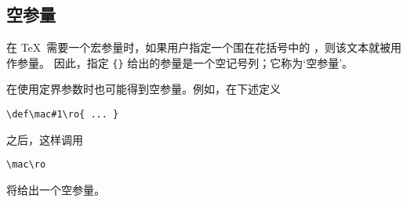 \documentclass[letterpaper]{book}
\begin{document}
\subsection{空参量}

在 \TeX\ 需要一个宏参量时，如果用户指定一个围在花括号中的
，则该文本就被用作参量。
因此，指定 \verb-{}- 给出的参量是一个空记号列；它称为`空参量'。

在使用定界参数时也可能得到空参量。例如，在下述定义
\begin{verbatim}
\def\mac#1\ro{ ... }
\end{verbatim}
之后，这样调用
\begin{verbatim}
\mac\ro
\end{verbatim}
将给出一个空参量。

\begin{comment}
However, only
one empty argument can be created this way: 
if the macro had been defined as
\begin{verbatim}
\def\mac#1#2\ro{ ... }
\end{verbatim}
the same call
\begin{verbatim}
\mac\ro \othermacro \stillothermacro
\end{verbatim}
will probably cause a `\n{Runaway argument?}' error message.
Explanation: the first parameter is undelimited, so the corresponding
argument is `\cs{ro}'; after that \TeX\ starts looking for a list
of tokens delimited by~\cs{ro}.
\end{comment}
\end{document}
